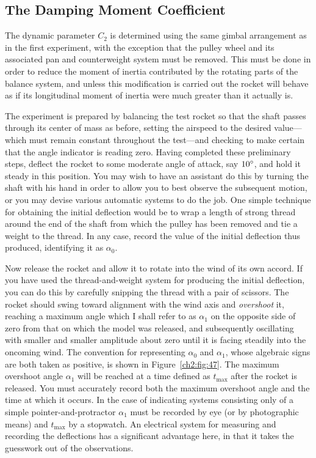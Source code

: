 \subsection{The Damping Moment Coefficient}\label{ch2:sec:5.3}

The dynamic parameter $C_2$ is determined using the same gimbal arrangement as
in the first experiment, with the exception that the pulley wheel and its
associated pan and counterweight system must be removed. This must be done in
order to reduce the moment of inertia contributed by the rotating parts of the
balance system, and unless this modification is carried out the rocket will
behave as if its longitudinal moment of inertia were much greater than it
actually is.

The experiment is prepared by balancing the test rocket so that the shaft
passes through its center of mass as before, setting the airspeed to the
desired value---which must remain constant throughout the test---and checking
to make certain that the angle indicator is reading zero. Having completed
these preliminary steps, deflect the rocket to some moderate angle of attack,
say $10^{\circ}$, and hold it steady in this position. You may wish to have an
assistant do this by turning the shaft with his hand in order to allow you to
best observe the subsequent motion, or you may devise various automatic
systems to do the job. One simple technique for obtaining the initial
deflection would be to wrap a length of strong thread around the end of the
shaft from which the pulley has been removed and tie a weight to the thread.
In any case, record the value of the initial deflection thus produced,
identifying it as $\alpha_0$.

Now release the rocket and allow it to rotate into the wind of its own accord.
If you have used the thread-and-weight system for producing the initial
deflection, you can do this by carefully snipping the thread with a pair of
scissors. The rocket should swing toward alignment with the wind axis and
\emph{overshoot} it, reaching a maximum angle which I shall refer to as
$\alpha_1$ on the opposite side of zero from that on which the model was
released, and subsequently oscillating with smaller and smaller amplitude
about zero until it is facing steadily into the oncoming wind. The convention
for representing $\alpha_0$ and $\alpha_1$, whose algebraic signs are both
taken as positive, is shown in Figure~\ref{ch2:fig:47}. The maximum overshoot
angle $\alpha_1$ will be reached at a time defined as $t_{\max}$ after the
rocket is released. You must accurately record both the maximum overshoot
angle and the time at which it occurs. In the case of indicating systems
consisting only of a simple pointer-and-protractor $\alpha_1$ must be recorded
by eye (or by photographic means) and $t_{\max}$ by a stopwatch. An electrical
system for measuring and recording the deflections has a significant advantage
here, in that it takes the guesswork out of the observations.

